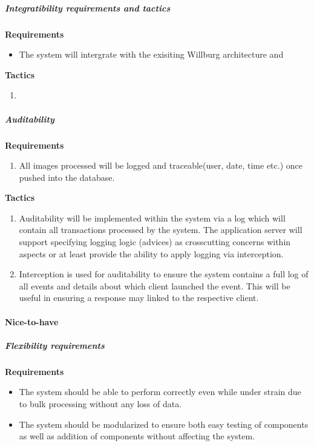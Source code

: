 \documentclass[a4paper,12pt]{report}
\begin{document}
			\subparagraph{Integratibility requirements and tactics}
				\hfill \break
				\hfill \break
				\textbf{Requirements}
					\begin{itemize}
						\item The system will intergrate with the exisiting Willburg architecture and 
					\end{itemize}
				
				\hfill \break
				\textbf{Tactics}
					\begin{enumerate}
						\item 
					\end{enumerate}

			\subparagraph{Auditability}
				\hfill \break
				\hfill \break
				\textbf{Requirements}
					\begin{enumerate}
						\item All images processed will be logged and traceable(user, date, time etc.) once pushed into the database.
					\end{enumerate}
				\hfill \break	
				\textbf{Tactics}
					\begin{enumerate}
						\item Auditability will be implemented within the system via a log which will contain all transactions processed by the system. The application server will support specifying logging logic (advices) as crosscutting concerns within aspects or at least provide the ability to apply logging via interception.
						\item Interception is used for auditability to ensure the system contains a full log of all events and details about which client launched the event. This will be useful in ensuring a response may linked to the respective client.
					\end{enumerate}



	\paragraph {Nice-to-have}

		\subparagraph{Flexibility requirements}
			\hfill \break
			\hfill \break
			\textbf{Requirements}
				\begin{itemize}
					\item The system should be able to perform correctly even while under strain due to bulk processing without any loss of data.
					\item The system should be modularized to ensure both easy testing of components as well as addition of components without affecting the system.
				\end{itemize}
\end{document}
